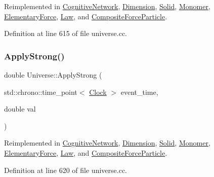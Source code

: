 Reimplemented in \mbox{\hyperlink{class_cognitive_network_a7d3252977440a9a5c004f748647ce885}{Cognitive\+Network}}, \mbox{\hyperlink{class_dimension_a9474b0dd3f6321a92bfe4375bb4b2266}{Dimension}}, \mbox{\hyperlink{class_solid_af2b3133138ce2482faa462d07aa23042}{Solid}}, \mbox{\hyperlink{class_monomer_a8747945cc2f7abd7ce0885345ad14ebc}{Monomer}}, \mbox{\hyperlink{class_elementary_force_a655a2c9489bfbbf15e05ba4953628134}{Elementary\+Force}}, \mbox{\hyperlink{class_law_a04efdc724335219ab0affdcffb55eea2}{Law}}, and \mbox{\hyperlink{class_composite_force_particle_ae26a03c2970a3825e8583a811339b28d}{Composite\+Force\+Particle}}.



Definition at line 615 of file universe.\+cc.

\mbox{\label{class_universe_a906a88b37f10bfa630bef49dfd0e907a}} 
\subsubsection{\texorpdfstring{Apply\+Strong()}{ApplyStrong()}}
{\footnotesize\ttfamily double Universe\+::\+Apply\+Strong (\begin{DoxyParamCaption}\item[{std\+::chrono\+::time\+\_\+point$<$ \mbox{\hyperlink{universe_8h_a0ef8d951d1ca5ab3cfaf7ab4c7a6fd80}{Clock}} $>$}]{event\+\_\+time,  }\item[{double}]{val }\end{DoxyParamCaption})\hspace{0.3cm}{\ttfamily [virtual]}}



Reimplemented in \mbox{\hyperlink{class_cognitive_network_a7a55750d3c42a277c4ffe04a87ab3b19}{Cognitive\+Network}}, \mbox{\hyperlink{class_dimension_a621e8f7f24db86e836c5b3da0f019290}{Dimension}}, \mbox{\hyperlink{class_solid_a0801ec0382bc509191575bcf9f5c83c1}{Solid}}, \mbox{\hyperlink{class_monomer_acba5091693082fdf2d28f1a5a4ae19a1}{Monomer}}, \mbox{\hyperlink{class_elementary_force_a8a16bff6b5df2b0ff918262bf6376ade}{Elementary\+Force}}, \mbox{\hyperlink{class_law_ab38659b209055df7e59f4bcd1b9e545a}{Law}}, and \mbox{\hyperlink{class_composite_force_particle_ac1464a04fbbca2d8927dfdbef0429878}{Composite\+Force\+Particle}}.



Definition at line 620 of file universe.\+cc.

